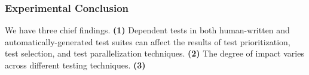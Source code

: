 \subsubsection{Experimental Conclusion}

We have three chief findings. \textbf{(1)}
Dependent tests in both human-written
and automatically-generated test suites
can affect the results of test prioritization,
test selection, and test parallelization
techniques. \textbf{(2)} The degree of 
impact varies across different testing
techniques. 
\textbf{(3)} 
